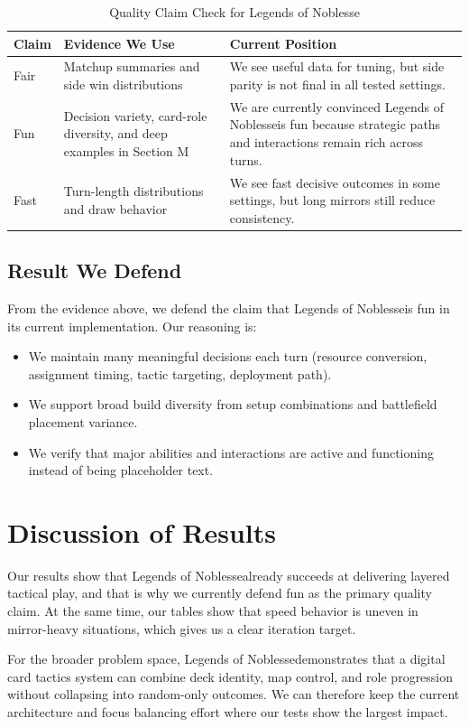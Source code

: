 \documentclass[12pt]{article}
\newcommand{\GameName}{Legends of Noblesse}
\begin{document}
\begin{table}[H]
\centering
\caption{Quality Claim Check for \GameName}
\label{tab:quality-check}
\begin{tabular}{|p{2.4cm}|p{4.2cm}|p{5.8cm}|}
\hline
\textbf{Claim} & \textbf{Evidence We Use} & \textbf{Current Position} \\
\hline
Fair & Matchup summaries and side win distributions & We see useful data for tuning, but side parity is not final in all tested settings. \\
\hline
Fun & Decision variety, card-role diversity, and deep examples in Section M & We are currently convinced \GameName is fun because strategic paths and interactions remain rich across turns. \\
\hline
Fast & Turn-length distributions and draw behavior & We see fast decisive outcomes in some settings, but long mirrors still reduce consistency. \\
\hline
\end{tabular}
\end{table}

\subsection{Result We Defend}
From the evidence above, we defend the claim that \GameName is fun in its current implementation. Our reasoning is:
\begin{itemize}
    \item We maintain many meaningful decisions each turn (resource conversion, assignment timing, tactic targeting, deployment path).
    \item We support broad build diversity from setup combinations and battlefield placement variance.
    \item We verify that major abilities and interactions are active and functioning instead of being placeholder text.
\end{itemize}

\section{Discussion of Results}
Our results show that \GameName already succeeds at delivering layered tactical play, and that is why we currently defend fun as the primary quality claim. At the same time, our tables show that speed behavior is uneven in mirror-heavy situations, which gives us a clear iteration target.

For the broader problem space, \GameName demonstrates that a digital card tactics system can combine deck identity, map control, and role progression without collapsing into random-only outcomes. We can therefore keep the current architecture and focus balancing effort where our tests show the largest impact.
\end{document}
